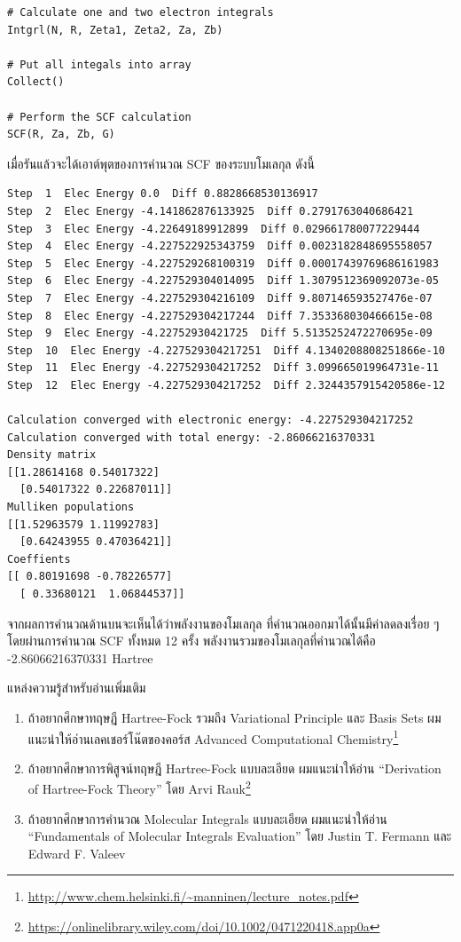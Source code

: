 \begin{lstlisting}[style=MyPython]
# Calculate one and two electron integrals
Intgrl(N, R, Zeta1, Zeta2, Za, Zb)

# Put all integals into array
Collect()

# Perform the SCF calculation
SCF(R, Za, Zb, G)
\end{lstlisting}
%
\vspace{5pt}
%
เมื่อรันแล้วจะได้เอาต์พุตของการคำนวณ SCF ของระบบโมเลกุล  ดังนี้

\vspace{5pt}

\begin{lstlisting}[style=MyPython]
Step  1  Elec Energy 0.0  Diff 0.8828668530136917
Step  2  Elec Energy -4.141862876133925  Diff 0.2791763040686421
Step  3  Elec Energy -4.22649189912899  Diff 0.029661780077229444
Step  4  Elec Energy -4.227522925343759  Diff 0.0023182848695558057
Step  5  Elec Energy -4.227529268100319  Diff 0.00017439769686161983
Step  6  Elec Energy -4.227529304014095  Diff 1.3079512369092073e-05
Step  7  Elec Energy -4.227529304216109  Diff 9.807146593527476e-07
Step  8  Elec Energy -4.227529304217244  Diff 7.353368030466615e-08
Step  9  Elec Energy -4.22752930421725  Diff 5.5135252472270695e-09
Step  10  Elec Energy -4.227529304217251  Diff 4.1340208808251866e-10
Step  11  Elec Energy -4.227529304217252  Diff 3.099665019964731e-11
Step  12  Elec Energy -4.227529304217252  Diff 2.3244357915420586e-12

Calculation converged with electronic energy: -4.227529304217252
Calculation converged with total energy: -2.86066216370331
Density matrix
[[1.28614168 0.54017322]
  [0.54017322 0.22687011]]
Mulliken populations
[[1.52963579 1.11992783]
  [0.64243955 0.47036421]]
Coeffients
[[ 0.80191698 -0.78226577]
  [ 0.33680121  1.06844537]]
\end{lstlisting}

\vspace{5pt}

จากผลการคำนวณด้านบนจะเห็นได้ว่าพลังงานของโมเลกุล  ที่คำนวณออกมาได้นั้นมีค่าลดลงเรื่อย ๆ โดยผ่านการคำนวณ SCF ทั้งหมด 12 ครั้ง พลังงานรวมของโมเลกุลที่คำนวณได้คือ -2.86066216370331 Hartree

\noindent แหล่งความรู้สำหรับอ่านเพิ่มเติม
%
\begin{enumerate}[topsep=0pt,noitemsep]
  \setlength\itemsep{0.5em}
  \item ถ้าอยากศึกษาทฤษฎี Hartree-Fock รวมถึง Variational Principle และ Basis Sets ผมแนะนำให้อ่านเลคเชอร์โน๊ตของคอร์ส Advanced Computational Chemistry\footnote{\url{http://www.chem.helsinki.fi/~manninen/lecture_notes.pdf}}

  \item ถ้าอยากศึกษาการพิสูจน์ทฤษฎี Hartree-Fock แบบละเอียด ผมแนะนำให้อ่าน \enquote{Derivation of Hartree-Fock Theory} โดย Arvi Rauk\footnote{\url{https://onlinelibrary.wiley.com/doi/10.1002/0471220418.app0a}}

  \item ถ้าอยากศึกษาการคำนวณ Molecular Integrals แบบละเอียด ผมแนะนำให้อ่าน \enquote{Fundamentals of Molecular Integrals Evaluation} โดย Justin T. Fermann และ Edward F. Valeev
\end{enumerate}

